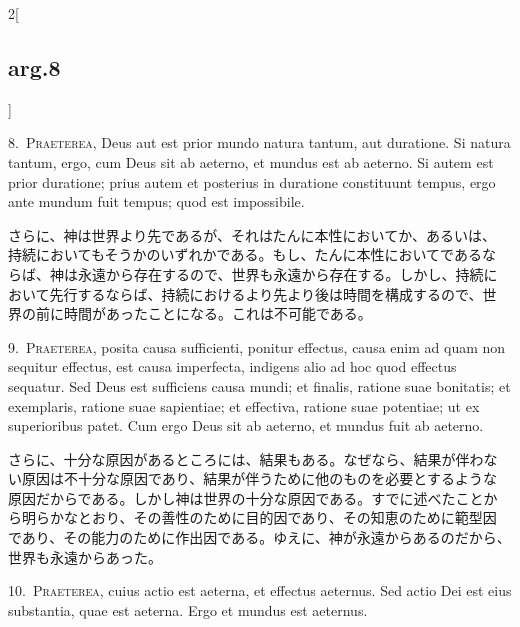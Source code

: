 \documentclass[paper=a4paper,fontsize=10pt,jafontsize=9pt,titlepage]{jlreq}
\begin{document}
\begin{paracol}{2}[\subsection{arg.8}]

8.~{\scshape Praeterea}, Deus aut est prior mundo natura tantum, aut duratione. Si
 natura tantum, ergo, cum Deus sit ab aeterno, et mundus est ab
 aeterno. Si autem est prior duratione; prius autem et posterius in
 duratione constituunt tempus, ergo ante mundum fuit tempus; quod est
 impossibile.


\switchcolumn


さらに、神は世界より先であるが、それはたんに本性においてか、あるいは、
持続においてもそうかのいずれかである。もし、たんに本性においてであるな
らば、神は永遠から存在するので、世界も永遠から存在する。しかし、持続に
おいて先行するならば、持続におけるより先より後は時間を構成するので、世
界の前に時間があったことになる。これは不可能である。




9.~{\scshape Praeterea}, posita causa sufficienti, ponitur effectus, causa enim ad
 quam non sequitur effectus, est causa imperfecta, indigens alio ad hoc
 quod effectus sequatur. Sed Deus est sufficiens causa mundi; et
 finalis, ratione suae bonitatis; et exemplaris, ratione suae
 sapientiae; et effectiva, ratione suae potentiae; ut ex superioribus
 patet. Cum ergo Deus sit ab aeterno, et mundus fuit ab aeterno.


\switchcolumn


さらに、十分な原因があるところには、結果もある。なぜなら、結果が伴わな
い原因は不十分な原因であり、結果が伴うために他のものを必要とするような
原因だからである。しかし神は世界の十分な原因である。すでに述べたことか
ら明らかなとおり、その善性のために目的因であり、その知恵のために範型因
であり、その能力のために作出因である。ゆえに、神が永遠からあるのだから、
世界も永遠からあった。




10.~{\scshape Praeterea}, cuius actio est aeterna, et effectus
 aeternus. Sed actio Dei est eius substantia, quae est aeterna. Ergo et
 mundus est aeternus.



\end{paracol}
\end{document}
